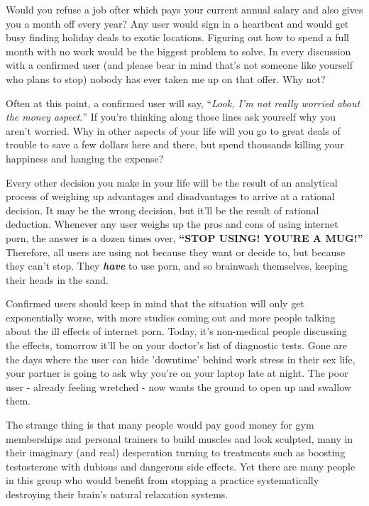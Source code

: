 \documentclass[
]{book}
\begin{document}
Would you refuse a job ofter which pays your current annual salary and also gives you a month off every year? Any user would sign in a heartbeat and would get busy finding holiday deals to exotic locations. Figuring out how to spend a full month with no work would be the biggest problem to solve. In every discussion with a confirmed user (and please bear in mind that's not someone like yourself who plans to stop) nobody has ever taken me up on that offer. Why not?

Often at this point, a confirmed user will say, ``\emph{Look, I'm not really worried about the money aspect.}'' If you're thinking along those lines ask yourself why you aren't worried. Why in other aspects of your life will you go to great deals of trouble to save a few dollars here and there, but spend thousands killing your happiness and hanging the expense?

Every other decision you make in your life will be the result of an analytical process of weighing up advantages and disadvantages to arrive at a rational decision. It may be the wrong decision, but it'll be the result of rational deduction. Whenever any user weighs up the pros and cons of using internet porn, the answer is a dozen times over, \textbf{``STOP USING! YOU'RE A MUG!''} Therefore, all users are using not because they want or decide to, but because they can't stop. They \textbf{\emph{have}} to use porn, and so brainwash themselves, keeping their heads in the sand.

Confirmed users should keep in mind that the situation will only get exponentially worse, with more studies coming out and more people talking about the ill effects of internet porn. Today, it's non-medical people discussing the effects, tomorrow it'll be on your doctor's list of diagnostic tests. Gone are the days where the user can hide 'downtime' behind work stress in their sex life, your partner is going to ask why you're on your laptop late at night. The poor user - already feeling wretched - now wants the ground to open up and swallow them.

The strange thing is that many people would pay good money for gym memberships and personal trainers to build muscles and look sculpted, many in their imaginary (and real) desperation turning to treatments such as boosting testosterone with dubious and dangerous side effects. Yet there are many people in this group who would benefit from stopping a practice systematically destroying their brain's natural relaxation systems.
\end{document}
